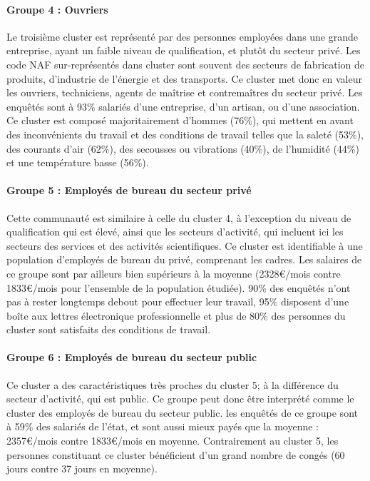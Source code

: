 \documentclass[11pt,fleqn,a4paper,openany,frenchb]{book} %
\begin{document}
\paragraph{Groupe 4 : Ouvriers\\}
Le troisième cluster est représenté par des personnes employées dans une grande entreprise, ayant un faible niveau de qualification, et plutôt du secteur privé. Les code NAF sur-représentés dans cluster sont souvent des secteurs de fabrication de produits, d'industrie de l'énergie et des transports. Ce cluster met donc en valeur les ouvriers, techniciens, agents de maîtrise et contremaîtres du secteur privé. Les enquêtés sont à 93\% salariés d'une entreprise, d'un artisan, ou d'une association. Ce cluster est composé majoritairement d'hommes (76\%), qui mettent en avant des inconvénients du travail et des conditions de travail telles que la saleté (53\%), des courants d'air (62\%), des secousses ou vibrations (40\%), de l'humidité (44\%) et une température basse (56\%). 

\paragraph{Groupe 5 : Employés de bureau du secteur privé\\}
Cette communauté est similaire à celle du cluster 4, à l'exception du niveau de qualification qui est élevé, ainsi que les secteurs d'activité, qui incluent ici les secteurs des services et des activités scientifiques. Ce cluster est identifiable à une population d'employés de bureau du privé, comprenant les cadres. Les salaires de ce groupe sont par ailleurs bien supérieurs à la moyenne (2328\euro{}/mois contre 1833\euro{}/mois pour l'ensemble de la population étudiée). 90\% des enquêtés n'ont pas à rester longtemps debout pour effectuer leur travail, 95\% disposent d'une boîte aux lettres électronique professionnelle et plus de 80\% des personnes du cluster sont satisfaits des conditions de travail.

\paragraph{Groupe 6 : Employés de bureau du secteur public\\}
Ce cluster a des caractéristiques très proches du cluster 5; à la différence du secteur d'activité, qui est public. Ce groupe peut donc être interprété comme le cluster des employés de bureau du secteur public. les enquêtés de ce groupe sont à 59\% des salariés de l'état, et sont aussi mieux payés que la moyenne : 2357\euro{}/mois contre 1833\euro{}/mois en moyenne. Contrairement au cluster 5, les personnes constituant ce cluster bénéficient d'un grand nombre de congés (60 jours contre 37 jours en moyenne).
\end{document}
